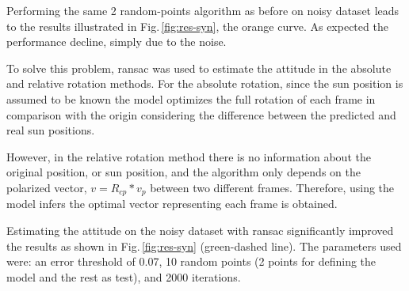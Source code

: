 Performing the same 2 random-points algorithm as before on noisy dataset leads
to the results illustrated in Fig.\,\ref{fig:res-syn}, the orange curve. As
expected the performance decline, simply due to the noise.


To solve this problem, \gls{ransac} was used to estimate the attitude in the
absolute and relative rotation methods. For the absolute rotation, since the
sun position is assumed to be known the model optimizes the full rotation of
each frame in comparison with the origin considering the difference between the
predicted and real sun positions.

However, in the relative rotation method there is no information about the
original position, or sun position, and the algorithm only depends on the
polarized vector, $v = R_{cp}*v_p$ between two different frames. Therefore,
using the model infers the optimal vector representing each frame is
obtained.

Estimating the attitude on the noisy dataset with \gls{ransac} significantly
improved the results as shown in Fig.\,\ref{fig:res-syn} (green-dashed
line). The parameters used were: an error threshold of 0.07, 10 random points
(2 points for defining the model and the rest as test), and 2000 iterations.

